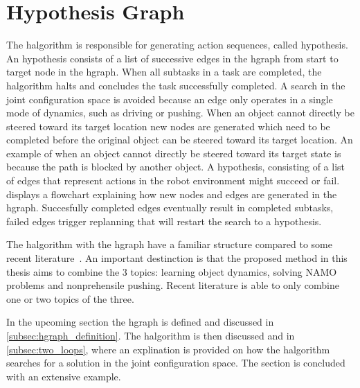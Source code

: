 \section{Hypothesis Graph}%
\label{sec:hgraph}
The \ac{halgorithm} is responsible for generating action sequences, called hypothesis. An hypothesis consists of a list of successive edges in the \ac{hgraph} from start to target node in the \ac{hgraph}. When all subtasks in a task are completed, the \acf{halgorithm} halts and concludes the task successfully completed. A search in the joint configuration space is avoided because an edge only operates in a single mode of dynamics, such as driving or pushing. When an object cannot directly be steered toward its target location new nodes are generated which need to be completed before the original object can be steered toward its target location. An example of when an object cannot directly be steered toward its target state is because the path is blocked by another object. A hypothesis, consisting of a list of edges that represent actions in the robot environment might succeed or fail.  displays a flowchart explaining how new nodes and edges are generated in the \ac{hgraph}. Succesfully completed edges eventually result in completed subtasks, failed edges trigger replanning that will restart the search to a hypothesis.\bs

The \ac{halgorithm} with the \ac{hgraph} have a familiar structure compared to some recent literature~\cite{ellis_navigation_2022,wang_affordancebased_2020}. An important destinction is that the proposed method in this thesis aims to combine the 3 topics: learning object dynamics, solving \ac{NAMO} problems and nonprehensile pushing. Recent literature is able to only combine one or two topics of the three.\bs

In the upcoming section the \ac{hgraph} is defined and discussed in \cref{subsec:hgraph_definition}. The \ac{halgorithm} is then discussed and in \cref{subsec:two_loops}, where an explination is provided on how the \ac{halgorithm} searches for a solution in the joint configuration space. The section is concluded with an extensive example.\bs





